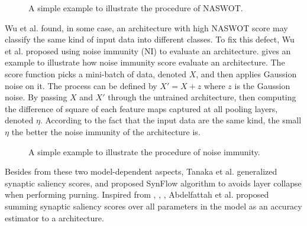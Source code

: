 \documentclass[sigconf]{acmart}
\begin{document}
    \begin{figure*}[!htb]
        \vspace{-\baselineskip}
        \caption{A simple example to illustrate the procedure of NASWOT.}
        \label{fig:naswot}
        \centering
        \vspace{-\baselineskip}
    \end{figure*}
	
    Wu et al. \cite{10092788} found, in some case, an architecture with high 
    NASWOT score may classify the same kind of input data into different classes. 
    To fix this defect, Wu et al. proposed using noise immunity (NI) to 
    evaluate an architecture.  gives an example to illustrate how 
    noise immunity score evaluate an architecture. The score function picks a 
    mini-batch of data, denoted $X$, and then applies Gaussion noise on it. 
    The process can be defined by $X'=X+z$ where $z$ is the Gaussion noise. 
    By passing $X$ and $X'$ through the untrained architecture, then computing 
    the difference of square of each feature maps captured at all pooling layers, 
    denoted $\eta$. According to the fact that the input data are the same kind, 
    the small $\eta$ the better the noise immunity of the architecture is.

    \begin{figure*}[!hb]
        \vspace{-\baselineskip}
        \caption{A simple example to illustrate the procedure of noise immunity.}
        \label{fig:ni}
        \centering
        \vspace{-\baselineskip}
    \end{figure*}

    Besides from these two model-dependent aspects, Tanaka et al. \cite{tanaka2020pruning} 
    generalized synaptic saliency scores, and proposed SynFlow algorithm to avoids layer 
    collapse when performing purning. 
    Inspired from \cite{tanaka2020pruning}, \cite{wang2020picking}, \cite{lee2019snip}, 
    Abdelfattah et al. \cite{abdelfattah2021zerocost} proposed summing synaptic saliency scores 
    over all parameters in the model as an accuracy estimator to a architecture.
\end{document}
